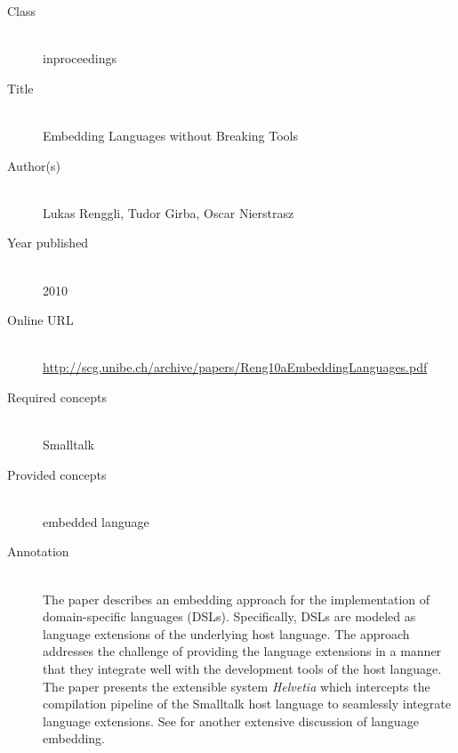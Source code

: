 \begin{description}
\item[Class]\mbox{}\\
inproceedings
\item[Title]\mbox{}\\
Embedding Languages without Breaking Tools
\item[Author(s)]\mbox{}\\
Lukas Renggli, Tudor Girba, Oscar Nierstrasz\item[Year published]\mbox{}\\
2010
\item[Online URL]\mbox{}\\
{\footnotesize\url{http://scg.unibe.ch/archive/papers/Reng10aEmbeddingLanguages.pdf}}
\item[Required concepts]\mbox{}\\
Smalltalk\item[Provided concepts]\mbox{}\\
embedded language\item[Annotation]\mbox{}\\
The paper describes an embedding approach for the implementation of domain-specific languages (DSLs). Specifically, DSLs are modeled as language extensions of the underlying host language. The approach addresses the challenge of providing the language extensions in a manner that they integrate well with the development tools of the host language. The paper presents the extensible system \emph{Helvetia} which intercepts the compilation pipeline of the Smalltalk host language to seamlessly integrate language extensions. See  for another extensive discussion of language embedding.
\end{description}

